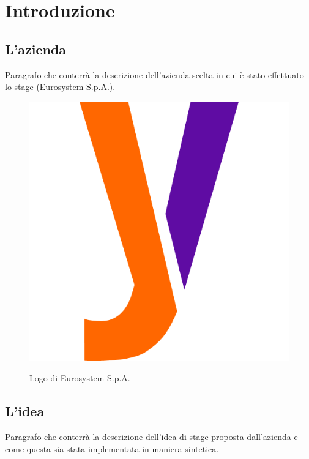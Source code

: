 \chapter{Introduzione}
\label{chap:introduzione}
\section{L'azienda}
Paragrafo che conterrà la descrizione dell'azienda scelta in cui è stato effettuato lo stage (Eurosystem S.p.A.).
\begin{figure}[H]
    \centering
    \includegraphics[alt={Testo alternativo dell'immagine}, width=0.4\columnwidth]{img/logo_azienda.png}
    \caption{Logo di Eurosystem S.p.A.}
    \label{fig:logo_eurosystem}
\end{figure} 

\section{L'idea}
Paragrafo che conterrà la descrizione dell'idea di stage proposta dall'azienda e come questa sia stata implementata in maniera sintetica.

